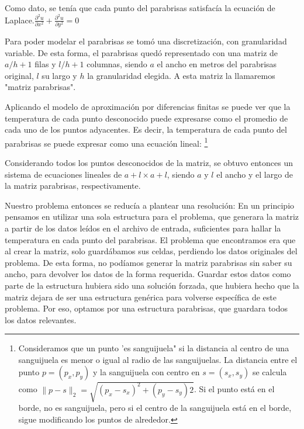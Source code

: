 \documentclass[spanish,a4paper]{article}
\begin{document}
Como dato, se tenía que cada punto del parabrisas satisfacía la ecuación de Laplace.\newline $\frac{\partial ^2u}{\partial x^2}+\frac{\partial ^2u}{\partial y^2}=0$

Para poder modelar el parabrisas se tomó una discretización, con granularidad variable. De esta forma, el parabrisas quedó representado con una matriz de $a/h+1$ filas y $l/h+1$ columnas, siendo $a$ el ancho en metros del parabrisas original, $l$ su largo y $h$ la granularidad elegida. A esta matriz la llamaremos "matriz parabrisas".

Aplicando el modelo de aproximación por diferencias finitas se puede ver que la temperatura de cada punto desconocido puede expresarse como el promedio de cada uno de los puntos adyacentes. Es decir, la temperatura de cada punto del parabrisas se puede expresar como una ecuación lineal: \footnote{Consideramos que un punto 'es sanguijuela" si la distancia al centro de una sanguijuela es menor o igual al radio de las sanguijuelas. La distancia entre el punto $p=(p_x, p_y)$ y la sanguijuela con centro en $s=(s_x, s_y)$ se calcula como $\| p-s  \|_{2}= \sqrt{(p_x-s_x)^2+(p_y-s_y)2}$. Si el punto está en el borde, no es sanguijuela, pero si el centro de la sanguijuela está en el borde, sigue modificando los puntos de alrededor.} \newline 


Considerando todos los puntos desconocidos de la matriz, se obtuvo entonces un sistema de ecuaciones lineales de $a+l \times a+l$, siendo $a$ y $l$ el ancho y el largo de la matriz parabrisas, respectivamente.

Nuestro problema entonces se reducía a plantear una resolución:
En un principio pensamos en utilizar una sola estructura para el problema, que generara la matriz a partir de los datos leídos en el archivo de entrada, suficientes para hallar la temperatura en cada punto del parabrisas. El problema que encontramos era que al crear la matriz, solo guardábamos sus celdas, perdiendo los datos originales del problema. De esta forma, no podíamos generar la matriz parabrisas sin saber su ancho, para devolver los datos de la forma requerida. Guardar estos datos como parte de la estructura hubiera sido una solución forzada, que hubiera hecho que la matriz dejara de ser una estructura genérica para volverse específica de este problema. Por eso, optamos por una estructura parabrisas, que guardara todos los datos relevantes.
\end{document}
